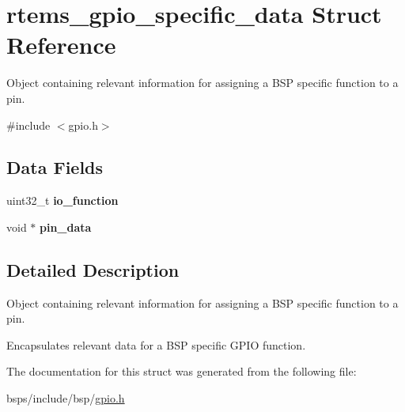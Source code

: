 \hypertarget{structrtems__gpio__specific__data}{}\section{rtems\+\_\+gpio\+\_\+specific\+\_\+data Struct Reference}
\label{structrtems__gpio__specific__data}


Object containing relevant information for assigning a B\+SP specific function to a pin.  




{\ttfamily \#include $<$gpio.\+h$>$}

\subsection*{Data Fields}
\begin{DoxyCompactItemize}
\item 
\mbox{\label{structrtems__gpio__specific__data_a20b83ec98b72577656320fa44f023751}} 
uint32\+\_\+t {\bfseries io\+\_\+function}
\item 
\mbox{\label{structrtems__gpio__specific__data_ac870f0bdf9469d2c5b1a6d94084b954a}} 
void $\ast$ {\bfseries pin\+\_\+data}
\end{DoxyCompactItemize}


\subsection{Detailed Description}
Object containing relevant information for assigning a B\+SP specific function to a pin. 

Encapsulates relevant data for a B\+SP specific G\+P\+IO function. 

The documentation for this struct was generated from the following file\+:\begin{DoxyCompactItemize}
\item 
bsps/include/bsp/\mbox{\hyperlink{gpio_8h}{gpio.\+h}}\end{DoxyCompactItemize}
